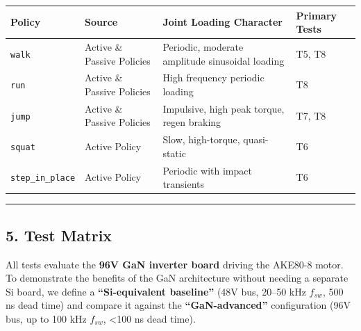 \documentclass[
]{article}
\newcounter{none} %
\begin{document}
{\def\LTcaptype{none} %
\begin{longtable}[]{@{}
  >{\raggedright\arraybackslash}p{}
  >{\raggedright\arraybackslash}p{}
  >{\raggedright\arraybackslash}p{}
  >{\raggedright\arraybackslash}p{}@{}}
\toprule\noalign{}
\begin{minipage}[b]{\linewidth}\raggedright
Policy
\end{minipage} & \begin{minipage}[b]{\linewidth}\raggedright
Source
\end{minipage} & \begin{minipage}[b]{\linewidth}\raggedright
Joint Loading Character
\end{minipage} & \begin{minipage}[b]{\linewidth}\raggedright
Primary Tests
\end{minipage} \\
\midrule\noalign{}
\endhead
\bottomrule\noalign{}
\endlastfoot
\texttt{walk} & Active \& Passive Policies & Periodic, moderate
amplitude sinusoidal loading & T5, T8 \\
\texttt{run} & Active \& Passive Policies & High frequency periodic
loading & T8 \\
\texttt{jump} & Active \& Passive Policies & Impulsive, high peak
torque, regen braking & T7, T8 \\
\texttt{squat} & Active Policy & Slow, high-torque, quasi-static & T6 \\
\texttt{step\_in\_place} & Active Policy & Periodic with impact
transients & T6 \\
\end{longtable}
}

\begin{center}\rule{0.5\linewidth}{0.5pt}\end{center}

\subsection{5. Test Matrix}\label{test-matrix}

All tests evaluate the \textbf{96V GaN inverter board} driving the
AKE80-8 motor. To demonstrate the benefits of the GaN architecture
without needing a separate Si board, we define a \textbf{``Si-equivalent
baseline''} (48V bus, 20--50 kHz \(f_{sw}\), 500 ns dead time) and
compare it against the \textbf{``GaN-advanced''} configuration (96V bus,
up to 100 kHz \(f_{sw}\), \textless100 ns dead time).
\end{document}
